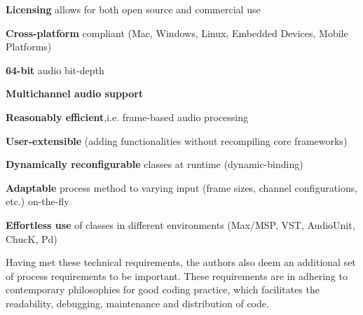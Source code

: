 \documentclass[twoside,10pt]{article}
\newenvironment{packed_item}{
\begin{itemize}
  \setlength{\itemsep}{1pt}
  \setlength{\parskip}{0pt}
  \setlength{\parsep}{0pt}
}{\end{itemize}}
\begin{document}
\begin{packed_item}%
	\item \textbf{Licensing} allows for both open source and commercial use
	\item \textbf{Cross-platform} compliant (Mac, Windows, Linux, Embedded Devices, Mobile Platforms)	
	\item \textbf{64-bit} audio bit-depth
	\item \textbf{Multichannel audio support}\\
	\item \textbf{Reasonably efficient},i.e. frame-based audio processing\\
	\item \textbf{User-extensible} (adding functionalities without recompiling core frameworks)\\
	\item \textbf{Dynamically reconfigurable} classes at runtime (dynamic-binding)\\
	\item \textbf{Adaptable} process method to varying input (frame sizes, channel configurations, etc.) on-the-fly\\
	\item \textbf{Effortless use} of classes in different environments (Max/MSP, VST, AudioUnit, ChucK, Pd)\\
\end{packed_item}%


\noindent Having met these technical requirements, the authors also deem an additional set of process requirements to be important.  These requirements are in adhering to contemporary philosophies for good coding practice, 
which facilitates the readability, debugging, maintenance and distribution of code. 
\end{document}
